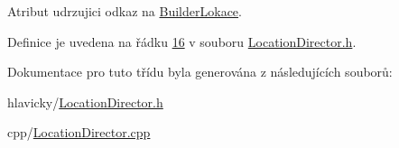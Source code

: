 Atribut udrzujici odkaz na \hyperlink{classIceAge_1_1BuilderLokace}{Builder\+Lokace}. 



Definice je uvedena na řádku \hyperlink{LocationDirector_8h_source_l00016}{16} v souboru \hyperlink{LocationDirector_8h_source}{Location\+Director.\+h}.



Dokumentace pro tuto třídu byla generována z následujících souborů\+:\begin{DoxyCompactItemize}
\item 
hlavicky/\hyperlink{LocationDirector_8h}{Location\+Director.\+h}\item 
cpp/\hyperlink{LocationDirector_8cpp}{Location\+Director.\+cpp}\end{DoxyCompactItemize}
